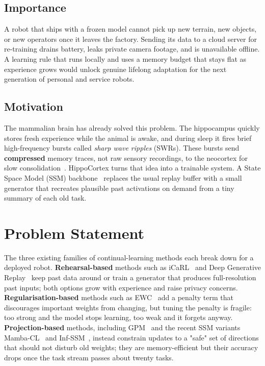 \documentclass[11pt,a4paper]{article}
\begin{document}
\subsection{Importance}
A robot that ships with a frozen model cannot pick up new terrain, new objects, or new operators once it leaves the factory. Sending its data to a cloud server for re-training drains battery, leaks private camera footage, and is unavailable offline. A learning rule that runs locally and uses a memory budget that stays flat as experience grows would unlock genuine lifelong adaptation for the next generation of personal and service robots.

\subsection{Motivation}
The mammalian brain has already solved this problem. The hippocampus quickly stores fresh experience while the animal is awake, and during sleep it fires brief high-frequency bursts called \emph{sharp wave ripples} (SWRs). These bursts send \textbf{compressed} memory traces, not raw sensory recordings, to the neocortex for slow consolidation~\citep{buzsaki2015hippocampal,mcclelland1995complementary}. HippoCortex turns that idea into a trainable system. A State Space Model (SSM) backbone~\citep{gu2023mamba} replaces the usual replay buffer with a small generator that recreates plausible past activations on demand from a tiny summary of each old task.

\section{Problem Statement}

The three existing families of continual-learning methods each break down for a deployed robot. \textbf{Rehearsal-based} methods such as iCaRL~\citep{rebuffi2017icarl} and Deep Generative Replay~\citep{shin2017continual} keep past data around or train a generator that produces full-resolution past inputs; both options grow with experience and raise privacy concerns. \textbf{Regularisation-based} methods such as EWC~\citep{kirkpatrick2017overcoming} add a penalty term that discourages important weights from changing, but tuning the penalty is fragile: too strong and the model stops learning, too weak and it forgets anyway. \textbf{Projection-based} methods, including GPM~\citep{saha2021gradient} and the recent SSM variants Mamba-CL~\citep{cheng2024mambacl} and Inf-SSM~\citep{lee2025exemplarfree}, instead constrain updates to a "safe" set of directions that should not disturb old weights; they are memory-efficient but their accuracy drops once the task stream passes about twenty tasks.
\end{document}
